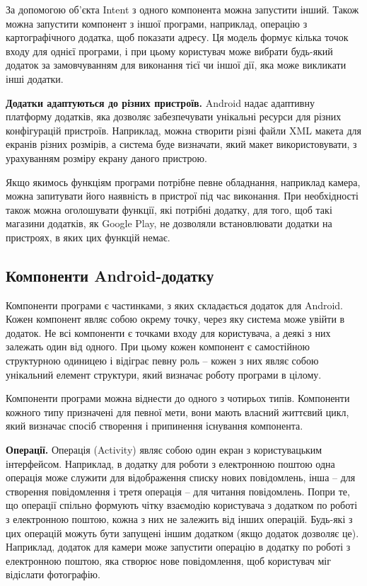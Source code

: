 \documentclass[../main.tex]{subfiles}
\begin{document}
За допомогою об'єкта Intent з одного компонента можна запустити інший. Також можна запустити компонент з іншої програми, наприклад, операцію з картографічного додатка, щоб показати адресу. Ця модель формує кілька точок входу для однієї програми, і при цьому користувач може вибрати будь-який додаток за замовчуванням для виконання тієї чи іншої дії, яка може викликати інші додатки.
	
\textbf{Додатки адаптуються до різних пристроїв.} 
Android надає адаптивну платформу додатків, яка дозволяє забезпечувати унікальні ресурси для різних конфігурацій пристроїв. Наприклад, можна створити різні файли XML макета для екранів різних розмірів, а система буде визначати, який макет використовувати, з урахуванням розміру екрану даного пристрою.

Якщо якимось функціям програми потрібне певне обладнання, наприклад камера, можна запитувати його наявність в пристрої під час виконання. При необхідності також можна оголошувати функції, які потрібні додатку, для того, щоб такі магазини додатків, як Google Play, не дозволяли встановлювати додатки на пристроях, в яких цих функцій немає.

\subsection{Компоненти Android-додатку}

Компоненти програми є частинками, з яких складається додаток для Android. Кожен компонент являє собою окрему точку, через яку система може увійти в додаток. Не всі компоненти є точками входу для користувача, а деякі з них залежать один від одного. При цьому кожен компонент є самостійною структурною одиницею і відіграє певну роль -- кожен з них являє собою унікальний елемент структури, який визначає роботу програми в цілому.

Компоненти програми можна віднести до одного з чотирьох типів. Компоненти кожного типу призначені для певної мети, вони мають власний життєвий цикл, який визначає спосіб створення і припинення існування компонента.

\textbf{Операції.} Операція (Activity) являє собою один екран з користувацьким інтерфейсом. Наприклад, в додатку для роботи з електронною поштою одна операція може служити для відображення списку нових повідомлень, інша -- для створення повідомлення і третя операція -- для читання повідомлень. Попри те, що операції спільно формують чітку взаємодію користувача з додатком по роботі з електронною поштою, кожна з них не залежить від інших операцій. Будь-які з цих операцій можуть бути запущені іншим додатком (якщо додаток дозволяє це). Наприклад, додаток для камери може запустити операцію в додатку по роботі з електронною поштою, яка створює нове повідомлення, щоб користувач міг відіслати фотографію.
\end{document}
